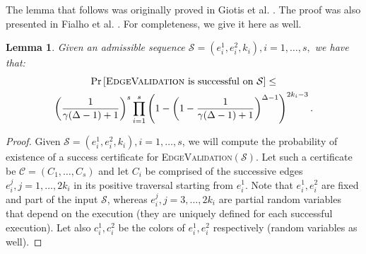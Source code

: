 \documentclass{amsart}
\theoremstyle{plain}
\newtheorem{lemma}{Lemma}
\newcommand{\ValE}{\textsc{EdgeValidation}}
\newcommand{\C}{\mathcal{C}}
\begin{document}
The lemma that follows was originally proved in Giotis et al. \cite[Lemma 5]{giotis2017acyclic}. The  proof  was also presented in Fialho et al. \cite[Appendix]{fialho2020new}. For completeness, we give it here as well.
\begin{lemma}\label{lem:boundadmissible}
Given an admissible  sequence ${\mathcal S}= (e^1_i, e^2_i, k_i), i=1, \ldots, s,$ we have that:    
\begin{multline}\label{eq:bound} \Pr\left[ \text{\ValE}  \text{\rm{ is successful on }} {\mathcal S}\right] \leq \\
 \left(\frac{1}{\gamma(\Delta-1)+1}\right)^s \prod_{i=1}^s\left(1 - \left(1 -\frac{1}{\gamma(\Delta-1)+1}\right)^{\Delta-1}\right)^{2k_i-3}. \nonumber\end{multline}		
\end{lemma}
\begin{proof} Given $\mathcal{S}= (e^1_i, e^2_i, k_i), i=1, \ldots, s$, we will compute the probability of existence of a success certificate for \ValE$(\mathcal{S})$.  Let such a certificate be $\C =(C_1, \ldots, C_s)$ and let $C_i$ be comprised of the successive edges $e_i^j, j =1, \ldots, 2k_i$ in its positive traversal starting from $e_i^1$. Note that $e_i^1, e_i^2$ are fixed and part of the input $\mathcal{S}$, whereas $e_i^j, j =3, \ldots, 2k_i$ are partial random variables that depend on the execution (they are uniquely defined for each successful execution). Let also $c_i^1, c_i^2$ be the colors of $e_i^1, e_i^2$ respectively (random variables as well).




\end{proof}
\end{document}
